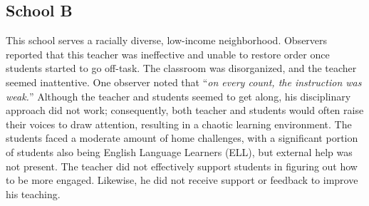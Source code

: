 \documentclass{sigchi}
\begin{document}


\subsection{School B}
This school serves a racially diverse, low-income neighborhood. Observers reported that this teacher was ineffective and unable to restore order once students started to go off-task. The classroom was disorganized, and the teacher seemed inattentive. One observer noted that ``\emph{on every count, the instruction was weak.}'' Although the teacher and students seemed to get along, his disciplinary approach did not work; consequently, both teacher and students would often raise their voices to draw attention, resulting in a chaotic learning environment. The students faced a moderate amount of home challenges, with a significant portion of students also being English Language Learners (ELL), but external help was not present. The teacher did not effectively support students in figuring out how to be more engaged. Likewise, he did not receive support or feedback to improve his teaching.
\end{document}
